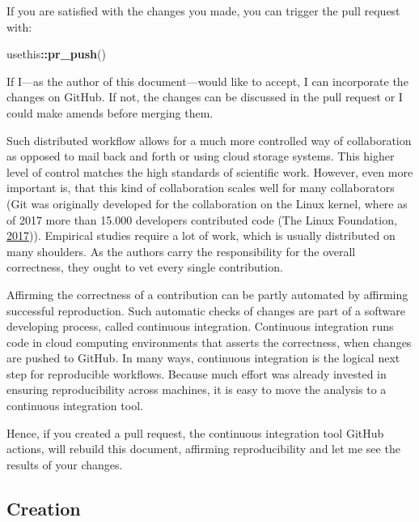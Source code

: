 \documentclass[12pt,a4paper,twoside]{article}
\newenvironment{Shaded}{\begin{snugshade}}{\end{snugshade}}
\newcommand{\KeywordTok}[1]{\textcolor[rgb]{0.13,0.29,0.53}{\textbf{#1}}}
\newcommand{\NormalTok}[1]{#1}
\newcommand{\OperatorTok}[1]{\textcolor[rgb]{0.81,0.36,0.00}{\textbf{#1}}}
\begin{document}
If you are satisfied with the changes you made, you can trigger the pull request with:

\begin{Shaded}
\begin{Highlighting}[]
\NormalTok{usethis}\OperatorTok{::}\KeywordTok{pr_push}\NormalTok{()}
\end{Highlighting}
\end{Shaded}

If I---as the author of this document---would like to accept, I can incorporate the changes on GitHub.
If not, the changes can be discussed in the pull request or I could make amends before merging them.

Such distributed workflow allows for a much more controlled way of collaboration as opposed to mail back and forth or using cloud storage systems.
This higher level of control matches the high standards of scientific work.
However, even more important is, that this kind of collaboration scales well for many collaborators (Git was originally developed for the collaboration on the Linux kernel, where as of 2017 more than 15.000 developers contributed code (The Linux Foundation, \protect\hyperlink{ref-thelinuxfoundation2017LinuxKernel2017}{2017})).
Empirical studies require a lot of work, which is usually distributed on many shoulders.
As the authors carry the responsibility for the overall correctness, they ought to vet every single contribution.

Affirming the correctness of a contribution can be partly automated by affirming successful reproduction.
Such automatic checks of changes are part of a software developing process, called continuous integration.
Continuous integration runs code in cloud computing environments that asserts the correctness, when changes are pushed to GitHub.
In many ways, continuous integration is the logical next step for reproducible workflows.
Because much effort was already invested in ensuring reproducibility across machines, it is easy to move the analysis to a continuous integration tool.

Hence, if you created a pull request, the continuous integration tool GitHub actions, will rebuild this document, affirming reproducibility and let me see the results of your changes.

\hypertarget{creation}{%
\subsection{Creation}\label{creation}}
\end{document}
